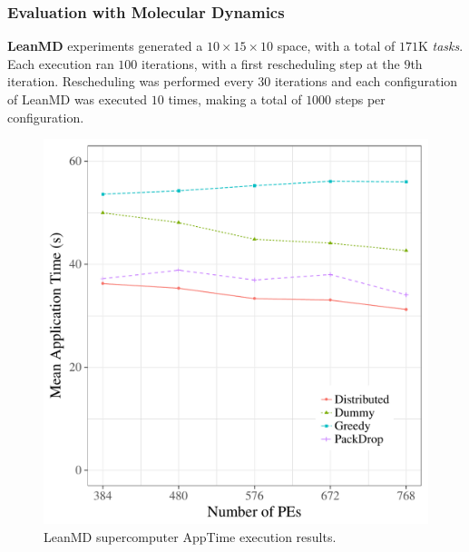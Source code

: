 \subsubsection{Evaluation with Molecular Dynamics} \label{sec:sdumont:md}

\textbf{LeanMD} experiments generated a $10\times15\times10$ space, with a total of $171$K \textit{tasks}.
Each execution ran $100$ iterations, with a first rescheduling step at the $9$th iteration. 
Rescheduling was performed every $30$ iterations and each configuration of LeanMD was executed $10$ times, making a total of $1000$ steps per configuration. 

\begin{figure}[!ht]
 \centering
 \includegraphics[width=0.9\linewidth]{images/apptime_leanmd_sdumont.pdf}
 \caption{LeanMD supercomputer AppTime execution results.}
 \label{fig:eval:sdumont:leanmd:apptime}
\end{figure}


